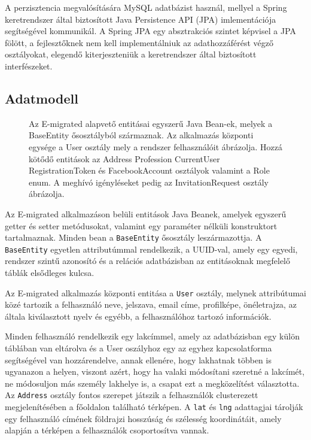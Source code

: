 A perzisztencia megvalósítására MySQL adatbázist használ, mellyel a Spring keretrendszer által biztosított Java Persistence API (JPA) imlementációja segítségével kommunikál. A Spring JPA egy absztrakciós szintet képvisel a JPA fölött, a fejlesztőknek nem kell implementálniuk az adathozzáférést végző osztályokat, elegendő kiterjeszteniük a keretrendszer által biztosított interfészeket. 


\begin{reviewed}
\section{Adatmodell}\label{sec:projektrol:adatmodell}
\begin{figure}[!t]
  \centering
  \caption{Az E-migrated alapvető entitásai egyszerű Java Bean-ek, melyek a BaseEntity ősosztályból származnak. Az alkalmazás központi egysége a User osztály\protect{,} mely a rendszer felhasználóit ábrázolja. Hozzá kötődő entitások az Address\protect{,} Profession\protect{,} CurrentUser\protect{,} RegistrationToken és FacebookAccount osztályok\protect{,} valamint a Role enum. A meghívó igényléseket pedig az InvitationRequest osztály ábrázolja.}
  \label{fig:adatmodell}
\end{figure}

Az E-migrated alkalmazáson belüli entitások Java Beanek, amelyek egyszerű getter és setter
metódusokat, valamint egy paraméter nélküli konstruktort tartalmaznak. Minden bean a \texttt{BaseEntity} ősosztály leszármazottja. A \texttt{BaseEntity} egyetlen attributúmmal rendelkezik, a UUID-val, amely egy egyedi, rendszer szintű azonosító és a relációs adatbázisban az entitásoknak megfelelő táblák elsődleges kulcsa. 

Az E-migrated alkalmazás központi entitása a \texttt{User} osztály,  melynek attribútumai közé tartozik a felhasználó neve, jelszava, email címe, profilképe, önéletrajza, az általa kiválasztott nyelv és egyébb, a felhasználóhoz tartozó információk. 



Minden felhasználó rendelkezik egy lakcímmel, amely az adatbázisban egy külön táblában van eltárolva és a User oszályhoz egy az egyhez kapcsolatforma segítségével van hozzárendelve, annak ellenére, hogy lakhatnak többen is ugyanazon a helyen, viszont azért, hogy ha valaki módosítani szeretné a lakcímét, ne módosuljon más személy lakhelye is, a csapat ezt a megközelítést választotta. Az \texttt{Address} osztály fontos szerepet játszik a felhasználók clusterezett megjelenítésében a főoldalon található térképen. A \texttt{lat} és \texttt{lng} adattagjai tárolják egy felhasználó címének földrajzi hosszúság és szélesség koordinátáit, amely alapján a térképen a felhasználók csoportosítva vannak. 


\end{reviewed}
